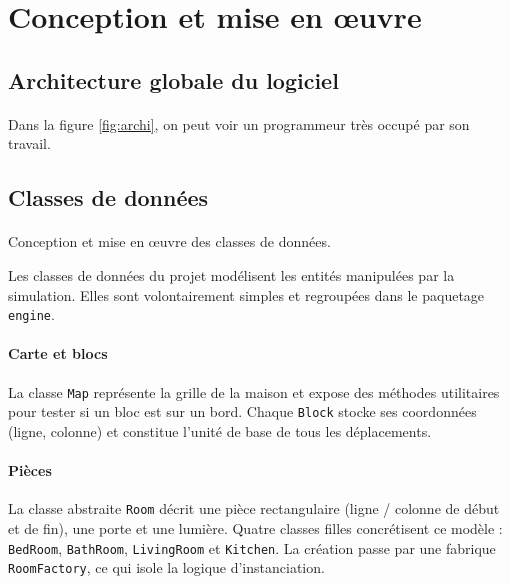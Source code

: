\newpage
\section{Conception et mise en œuvre}
\label{sec:concep}

\subsection{Architecture globale du logiciel}

\paragraph{} Dans la figure \ref{fig:archi}, on peut voir un programmeur très occupé par son travail.


\subsection{Classes de données}

\paragraph{} Conception et mise en œuvre des classes de données.

Les classes de données du projet modélisent les entités manipulées par la simulation. Elles sont volontairement simples et regroupées dans le paquetage \texttt{engine}.

\paragraph{Carte et blocs} La classe \texttt{Map} représente la grille de la maison et expose des méthodes utilitaires pour tester si un bloc est sur un bord. Chaque \texttt{Block} stocke ses coordonnées (ligne, colonne) et constitue l'unité de base de tous les déplacements.

\paragraph{Pièces} La classe abstraite \texttt{Room} décrit une pièce rectangulaire (ligne / colonne de début et de fin), une porte et une lumière. Quatre classes filles concrétisent ce modèle : \texttt{BedRoom}, \texttt{BathRoom}, \texttt{LivingRoom} et \texttt{Kitchen}. La création passe par une fabrique \texttt{RoomFactory}, ce qui isole la logique d'instanciation.

